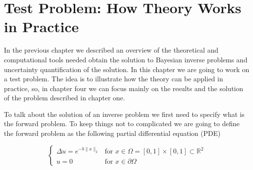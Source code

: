 \documentclass[12pt]{book}
\begin{document}
\chapter{Test Problem: How Theory Works in Practice}

In the previous chapter we described an overview of the theoretical and computational tools needed obtain
the solution to Bayesian inverse problems and uncertainty quantification of the solution. In this chapter
we are going to work on a test problem. The idea is to illustrate how the theory can be applied in practice, so,
in chapter four we can focus mainly on the results and the  solution of the problem described in chapter one.




To talk about the solution of an inverse problem we first need to specify what is the forward problem. 
To keep things not to complicated we are going to define the forward problem as the following
partial differential equation (PDE)

\begin{equation}\label{eqntoyproblem}
\left\{
	\begin{array}{ll}
		\Delta u=e^{-b\|x\|_{2}} &\mbox{for } x\in\Omega=[0,1]\times [0,1]\subset\mathbb{R}^{2} \\
		u=0 & \mbox{for } x\in\partial\Omega
	\end{array}
\right.
\end{equation} 
\end{document}
